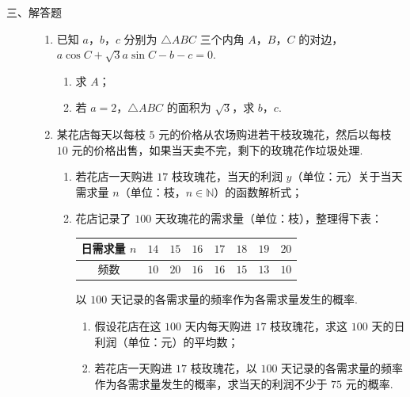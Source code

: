 \begin{description}

    \item[三、解答题]

    \begin{enumerate}[leftmargin=5pt]

      \addtocounter{enumi}{+16}

        \item 已知 \(a\)，\(b\)，\(c\) 分别为 \(\triangle ABC\) 三个内角 \(A\)，\(B\)，\(C\) 的对边，\(a \cos C + \sqrt{3} a \sin C - b - c = 0\).

\begin{enumerate}
\item 求 \(A\)；
\item 若 \(a = 2\)，\(\triangle ABC\) 的面积为 \(\sqrt{3}\)，求 \(b\)，\(c\).
\end{enumerate}

        \item 某花店每天以每枝 \(5\) 元的价格从农场购进若干枝玫瑰花，然后以每枝 \(10\) 元的价格出售，如果当天卖不完，剩下的玫瑰花作垃圾处理.

\begin{enumerate}
\item 若花店一天购进 \(17\) 枝玫瑰花，当天的利润 \(y\)（单位：元）关于当天需求量 \(n\)（单位：枝，\(n \in \mathbb{N}\)）的函数解析式；
\item 花店记录了 \(100\) 天玫瑰花的需求量（单位：枝），整理得下表：

\begin{center}
\renewcommand{\arraystretch}{1.2}
\begin{tabular}{|c|c|c|c|c|c|c|c|}
\hline
日需求量 \(n\) & \(14\) & \(15\) & \(16\) & \(17\) & \(18\) & \(19\) & \(20\) \\
\hline
频数 & \(10\) & \(20\) & \(16\) & \(16\) & \(15\) & \(13\) & \(10\) \\
\hline
\end{tabular}
\end{center}

以 \(100\) 天记录的各需求量的频率作为各需求量发生的概率.

\begin{enumerate}
\item 假设花店在这 \(100\) 天内每天购进 \(17\) 枝玫瑰花，求这 \(100\) 天的日利润（单位：元）的平均数；
\item 若花店一天购进 \(17\) 枝玫瑰花，以 \(100\) 天记录的各需求量的频率作为各需求量发生的概率，求当天的利润不少于 \(75\) 元的概率.
\end{enumerate}
\end{enumerate}


\end{enumerate}
\end{description}
